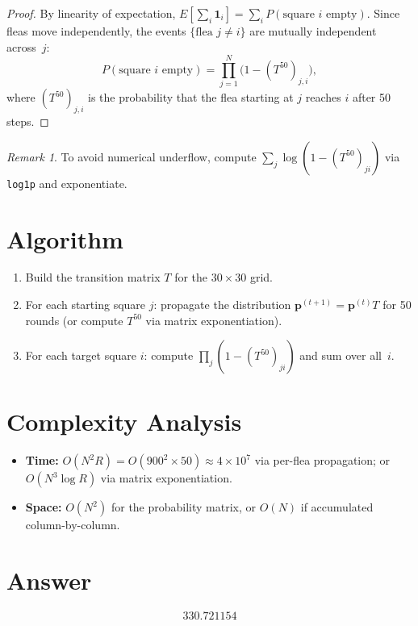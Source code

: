 \documentclass[12pt]{article}
\theoremstyle{definition}
\theoremstyle{remark}
\newtheorem*{remark}{Remark}
\begin{document}
\begin{proof}
By linearity of expectation, $E[\sum_i \mathbf{1}_i] = \sum_i P(\text{square }i\text{ empty})$. Since fleas move independently, the events $\{\text{flea }j \neq i\}$ are mutually independent across~$j$:
\[
P(\text{square }i\text{ empty}) = \prod_{j=1}^{N}\bigl(1 - (T^{50})_{j,i}\bigr),
\]
where $(T^{50})_{j,i}$ is the probability that the flea starting at $j$ reaches $i$ after 50 steps.
\end{proof}

\begin{remark}
To avoid numerical underflow, compute $\sum_j \log(1-(T^{50})_{ji})$ via \texttt{log1p} and exponentiate.
\end{remark}

\section{Algorithm}

\begin{enumerate}
\item Build the transition matrix $T$ for the $30 \times 30$ grid.
\item For each starting square $j$: propagate the distribution $\mathbf{p}^{(t+1)} = \mathbf{p}^{(t)} T$ for 50 rounds (or compute $T^{50}$ via matrix exponentiation).
\item For each target square $i$: compute $\prod_j(1-(T^{50})_{ji})$ and sum over all~$i$.
\end{enumerate}

\section{Complexity Analysis}

\begin{itemize}
\item \textbf{Time:} $O(N^2 R) = O(900^2 \times 50) \approx 4\times 10^7$ via per-flea propagation; or $O(N^3 \log R)$ via matrix exponentiation.
\item \textbf{Space:} $O(N^2)$ for the probability matrix, or $O(N)$ if accumulated column-by-column.
\end{itemize}

\section{Answer}

\[
\boxed{330.721154}
\]
\end{document}

